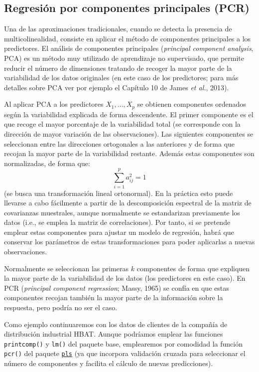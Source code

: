\documentclass[
]{book}
\theoremstyle{break}
\theoremstyle{definition}
\theoremstyle{definition}
\theoremstyle{definition}
\theoremstyle{remark}
\begin{document}
\hypertarget{regresiuxf3n-por-componentes-principales-pcr}{%
\subsection{Regresión por componentes principales (PCR)}\label{regresiuxf3n-por-componentes-principales-pcr}}

Una de las aproximaciones tradicionales, cuando se detecta la presencia de multicolinealidad, consiste en aplicar el método de componentes principales a los predictores.
El análisis de componentes principales (\emph{principal component analysis}, PCA) es un método muy utilizado de aprendizaje no supervisado, que permite reducir el número de dimensiones tratando de recoger la mayor parte de la variabilidad de los datos originales (en este caso de los predictores; para más detalles sobre PCA ver por ejemplo el Capítulo 10 de James \emph{et al.}, 2013).

Al aplicar PCA a los predictores \(X_1, \ldots, X_p\) se obtienen componentes ordenados según la variabilidad explicada de forma descendente.
El primer componente es el que recoge el mayor porcentaje de la variabilidad total (se corresponde con la dirección de mayor variación de las observaciones).
Las siguientes componentes se seleccionan entre las direcciones ortogonales a las anteriores y de forma que recojan la mayor parte de la variabilidad restante.
Además estas componentes son normalizadas, de forma que:
\[\sum_{i=1}^p a_{ij}^2 = 1\]
(se busca una transformación lineal ortonormal).
En la práctica esto puede llevarse a cabo fácilmente a partir de la descomposición espectral de la matriz de covarianzas muestrales, aunque normalmente se estandarizan previamente los datos (i.e., se emplea la matriz de correlaciones).
Por tanto, si se pretende emplear estas componentes para ajustar un modelo de regresión, habrá que conservar los parámetros de estas transformaciones para poder aplicarlas a nuevas observaciones.

Normalmente se seleccionan las primeras \(k\) componentes de forma que expliquen la mayor parte de la variabilidad de los datos (los predictores en este caso).
En PCR (\emph{principal component regression}; Massy, 1965) se confía en que estas componentes recojan también la mayor parte de la información sobre la respuesta, pero podría no ser el caso.

Como ejemplo continuaremos con los datos de clientes de la compañía de distribución industrial HBAT.
Aunque podríamos emplear las funciones \texttt{printcomp()} y \texttt{lm()} del paquete base, emplearemos por comodidad la función \texttt{pcr()} del paquete \href{https://mevik.net/work/software/pls.html}{\texttt{pls}} (ya que incorpora validación cruzada para seleccionar el número de componentes y facilita el cálculo de nuevas predicciones).
\end{document}
